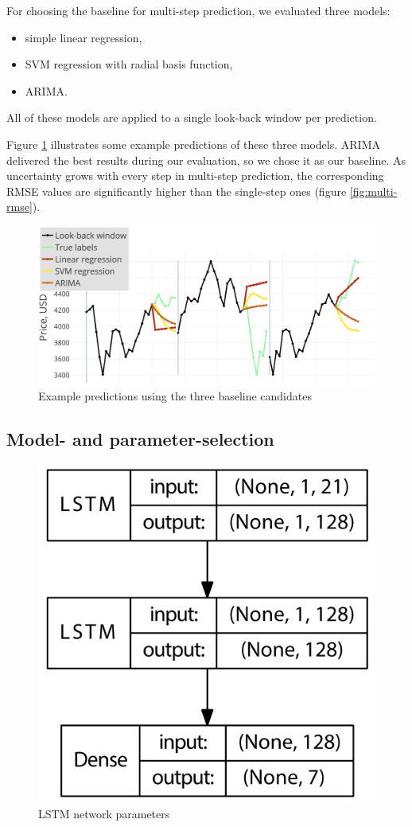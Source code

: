 \documentclass{article}
\begin{document}
For choosing the baseline for multi-step prediction, we evaluated three models:

\begin{itemize}
	\item simple linear regression,
	\item SVM regression with radial basis function,
	\item ARIMA.
\end{itemize}

All of these models are applied to a single look-back window per prediction.

Figure \ref{fig:multi-naive} illustrates some example predictions of these three models. ARIMA delivered the best results during our evaluation, so we chose it as our baseline. As uncertainty grows with every step in multi-step prediction, the corresponding RMSE values are significantly higher than the single-step ones (figure \ref{fig:multi-rmse}). 

\begin{figure}[h!]
\centering
\includegraphics[width=0.9\columnwidth]{images/multi-naive.png}
\caption{Example predictions using the three baseline candidates}
\label{fig:multi-naive}
\end{figure}

\subsection{Model- and parameter-selection}
\label{sec:multi-lstm}

\begin{figure}[h!]
\centering
\includegraphics[width=0.4\columnwidth]{images/LSTM.png}
\caption{LSTM network parameters}
\label{fig:lstm}
\end{figure}
\end{document}
